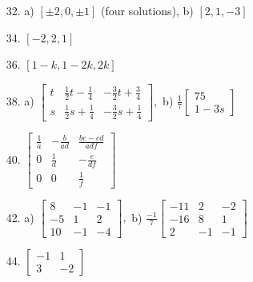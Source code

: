\documentclass{article}
\begin{document}
\begin{enumerate}
    \item[32.] 
        a) $[\pm2,0,\pm1]$ \hspace{5pt} (four solutions),\hspace{10pt} b) $[2,1,-3]$
        
    \item[34.]
        $[-2, 2, 1]$
        
    \item[36.]
        $[1-k, 1-2k, 2k]$
    
    \bigskip
    \item[38.]
        a) 
        $
        \begin{bmatrix}
        t & \frac{1}{2}t - \frac{1}{4} & -\frac{3}{2}t + \frac{3}{4} \\
        s & \frac{1}{2}s + \frac{1}{4} & -\frac{3}{2}s + \frac{1}{4}
        \end{bmatrix}
        ,
        $
        \hspace{9pt}
        b) 
        $
        \frac{1}{7} 
        \begin{bmatrix} 75 \\ 1-3s \end{bmatrix}
        $
    
    \bigskip
    \item[40.]
        $
        \begin{bmatrix}
        \frac{1}{a} & -\frac{b}{ad} & \frac{be-cd}{adf} \\
        0 & \frac{1}{d} & -\frac{e}{df}\\
        0 & 0 & \frac{1}{f}
        \end{bmatrix}
         $
    \bigskip
    \item[42.]
        a)
        $
        \begin{bmatrix}
        8 & -1 & -1 \\
        -5 & 1 & 2 \\
        10 & -1 & -4
        \end{bmatrix}
        ,
        $
        \hspace{9pt}
        b)
        $
        \frac{-1}{7}
        \begin{bmatrix}
        -11 & 2 & -2 \\
        -16 & 8 & 1 \\
        2 & -1 & -1
        \end{bmatrix}
        $
    \bigskip   
    \item[44.] 
        $
        \begin{bmatrix}
        -1 & 1 \\
        3 & -2
        \end{bmatrix}
        $
\end{enumerate}
\end{document}

